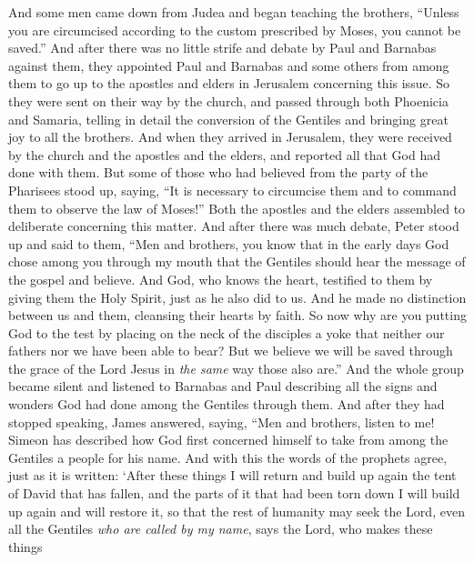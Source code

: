 \begin{biblechapter} %
 And some men came down from Judea and began teaching the brothers, “Unless you are circumcised according to the custom prescribed by Moses, you cannot be saved.”
\verse And after there was no little strife and debate by Paul and Barnabas against them, they appointed Paul and Barnabas and some others from among them to go up to the apostles and elders in Jerusalem concerning this issue.
\verse So they were sent on their way by the church, and passed through both Phoenicia and Samaria, telling in detail the conversion of the Gentiles and bringing great joy to all the brothers.
\verse And when they arrived in Jerusalem, they were received by the church and the apostles and the elders, and reported all that God had done with them.
\verse But some of those who had believed from the party of the Pharisees stood up, saying, “It is necessary to circumcise them and to command them to observe the law of Moses!”
\verse Both the apostles and the elders assembled to deliberate concerning this matter.
\verse And after there was much debate, Peter stood up and said to them, “Men and brothers, you know that in the early days God chose among you through my mouth that the Gentiles should hear the message of the gospel and believe.
\verse And God, who knows the heart, testified to them by giving them the Holy Spirit, just as he also did to us.
\verse And he made no distinction between us and them, cleansing their hearts by faith.
\verse So now why are you putting God to the test by placing on the neck of the disciples a yoke that neither our fathers nor we have been able to bear?
\verse But we believe we will be saved through the grace of the Lord Jesus in \textit{the same} way those also are.”
\verse And the whole group became silent and listened to Barnabas and Paul describing all the signs and wonders God had done among the Gentiles through them.
\verse And after they had stopped speaking, James answered, saying, “Men and brothers, listen to me!
\verse Simeon has described how God first concerned himself to take from among the Gentiles a people for his name.
\verse And with this the words of the prophets agree, just as it is written:
\verse ‘After these things I will return 
and build up again the tent of David that has fallen, 
and the parts of it that had been torn down I will build up again 
and will restore it,
\verse so that the rest of humanity may seek the Lord, 
even all the Gentiles \textit{who are called by my name}, 
says the Lord, who makes these things

\end{biblechapter}
